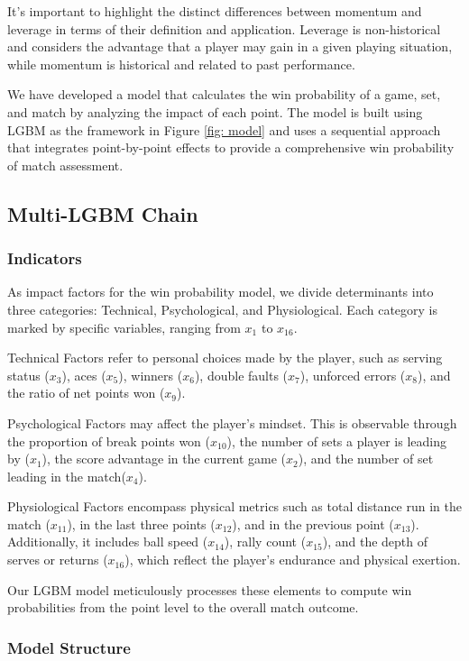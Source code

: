 \documentclass{mcmthesis}
\begin{document}
It's important to highlight the distinct differences between momentum and leverage in terms of their definition and application. Leverage is non-historical and considers the advantage that a player may gain in a given playing situation, while momentum is historical and related to past performance.

We have developed a model that calculates the win probability of a game, set, and match by analyzing the impact of each point. The model is built using LGBM as the framework in Figure \ref{fig: model} and uses a sequential approach that integrates point-by-point effects to provide a comprehensive win probability of match assessment.

\subsection{Multi-LGBM Chain}
\subsubsection{Indicators}
As impact factors for the win probability model, we divide determinants into three categories: Technical, Psychological, and Physiological. Each category is marked by specific variables, ranging from $x_1$ to $x_{16}$.

Technical Factors refer to personal choices made by the player, such as serving status ($x_3$), aces ($x_5$), winners ($x_6$), double faults ($x_7$), unforced errors ($x_8$), and the ratio of net points won ($x_9$).

Psychological Factors may affect the player's mindset. This is observable through the proportion of break points won ($x_{10}$), the number of sets a player is leading by ($x_1$), the score advantage in the current game ($x_2$), and the number of set leading in the match($x_4$).

Physiological Factors encompass physical metrics such as total distance run in the match ($x_{11}$), in the last three points ($x_{12}$), and in the previous point ($x_{13}$). Additionally, it includes ball speed ($x_{14}$), rally count ($x_{15}$), and the depth of serves or returns ($x_{16}$), which reflect the player's endurance and physical exertion.

Our LGBM model meticulously processes these elements to compute win probabilities from the point level to the overall match outcome.

\subsubsection{Model Structure}
\end{document}
